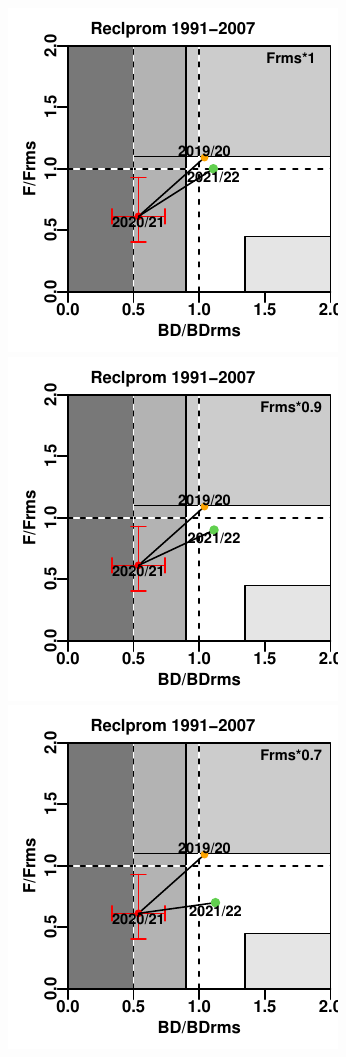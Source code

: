 \documentclass[
  spanish,
]{article}
\begin{document}
\pagebreak

\includegraphics{FigurasInforme_Marzo/Fig45a_marzo-1.pdf}
\includegraphics{FigurasInforme_Marzo/Fig45a_marzo-2.pdf}
\includegraphics{FigurasInforme_Marzo/Fig45a_marzo-3.pdf}
\end{document}
